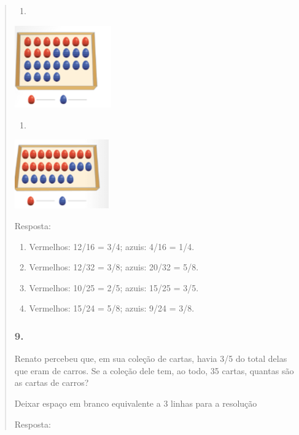 \begin{enumerate}
\begin{escolha}
\begin{enumerate}
\begin{itemize}
\begin{itemize}
\begin{escolha}
\begin{quote}
\begin{escolha}
{\begin{enumerate}
\def\labelenumi{\alph{enumi})}
\item
\end{enumerate}

\includegraphics[width=1.63347in,height=1.39179in]{media/image120.png}

\begin{enumerate}
\def\labelenumi{\alph{enumi})}
\item
\end{enumerate}

\includegraphics[width=1.60014in,height=1.16677in]{media/image121.png}

Resposta:

\begin{enumerate}
\def\labelenumi{\alph{enumi})}
\item
  Vermelhos: 12/16 = 3/4; azuis: 4/16 = 1/4.
\item
  Vermelhos: 12/32 = 3/8; azuis: 20/32 = 5/8.
\item
  Vermelhos: 10/25 = 2/5; azuis: 15/25 = 3/5.
\item
  Vermelhos: 15/24 = 5/8; azuis: 9/24 = 3/8.
\end{enumerate}

\subsubsection{9.}\label{section-112}

Renato percebeu que, em sua coleção de cartas, havia 3/5 do total delas
que eram de carros. Se a coleção dele tem, ao todo, 35 cartas, quantas são
as cartas de carros?

Deixar espaço em branco equivalente a 3 linhas para a resolução

Resposta:

}
\end{escolha}
\end{quote}
\end{escolha}
\end{itemize}
\end{itemize}
\end{enumerate}
\end{escolha}
\end{enumerate}
